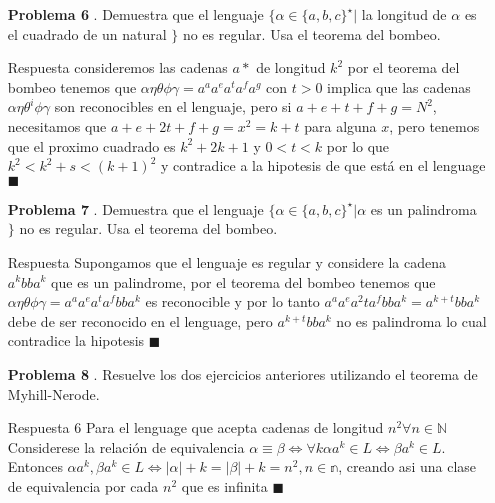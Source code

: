 \documentclass{article}
\begin{document}
\begin{enumerate}
\item[\bf{Problema 6}]. Demuestra que el lenguaje
$\{\alpha \in \{a, b, c\}^\star | $ la longitud de $\alpha$ es el cuadrado de un natural $\}$
no es regular. Usa el teorema del bombeo.
\item[Respuesta]
consideremos las cadenas $a*$ de longitud $k^2$ 
por el teorema del bombeo tenemos que $\alpha\eta\theta\phi\gamma=a^aa^ea^ta^fa^g$ con $t > 0$ implica que las cadenas $\alpha\eta\theta^i\phi\gamma$ son reconocibles en el lenguaje, pero si $a+e+t+f+g=N^2$, necesitamos que $a+e+2t+f+g=x^2 = k + t$ para alguna $x$, pero tenemos que el proximo cuadrado es $k^2+2k+1$ y $0<t<k$ por lo que $k^2<k^2+s< (k+1)^2$ y contradice a la hipotesis de que está en el lenguage $\blacksquare$

\item[\bf{Problema 7}]. Demuestra que el lenguaje
$\{\alpha \in \{a, b, c\}^\star | \alpha $ es un palindroma $\}$
no es regular. Usa el teorema del bombeo.
\item[Respuesta]
Supongamos que el lenguaje es regular y considere la cadena $a^kbba^k$ que es un palindrome, por el teorema del bombeo tenemos que $\alpha\eta\theta\phi\gamma=a^aa^ea^ta^fbba^k$ es reconocible y por lo tanto $a^aa^ea^2ta^fbba^k = a^{k+t}bba^k$ debe de ser reconocido en el lenguage, pero $a^{k+t}bba^k$ no es palindroma lo cual contradice la hipotesis $\blacksquare$


\item[\bf{Problema 8}]. Resuelve los dos ejercicios anteriores utilizando el teorema de Myhill-Nerode.

\item[Respuesta 6] Para el lenguage que acepta cadenas de longitud $n^2 \forall n \in \mathbb{N}$  Considerese la relación de equivalencia $\alpha \equiv \beta \Leftrightarrow \forall k \alpha a^k \in L \Leftrightarrow \beta a^k \in L$. Entonces $\alpha a^k, \beta a^k \in L  \Leftrightarrow |\alpha|+k =|\beta|+k=n^2, n \in \mathbb{n}$, creando asi una clase de equivalencia por cada $n^2$ que es infinita $\blacksquare$

\end{enumerate}
\end{document}
